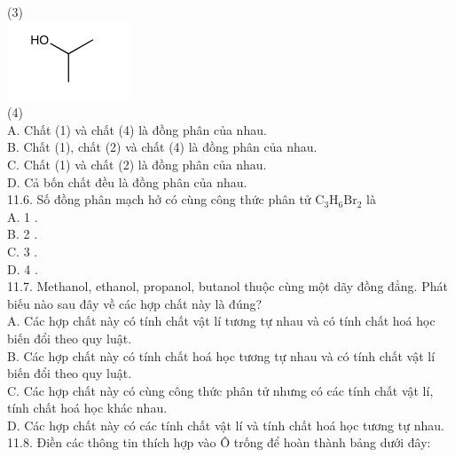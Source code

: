 \documentclass[10pt]{article}
\begin{document}
(3)\\
\includegraphics{smile-27287e9c228b535dfc34387348ef0576563872c2}\\
(4)\\
A. Chất (1) và chất (4) là đồng phân của nhau.\\
B. Chất (1), chất (2) và chất (4) là đồng phân của nhau.\\
C. Chất (1) và chất (2) là đồng phân của nhau.\\
D. Cả bốn chất đều là đồng phân của nhau.\\
11.6. Số đồng phân mạch hở có cùng công thức phân tử $\mathrm{C}_{3} \mathrm{H}_{6} \mathrm{Br}_{2}$ là\\
A. 1 .\\
B. 2 .\\
C. 3 .\\
D. 4 .\\
11.7. Methanol, ethanol, propanol, butanol thuộc cùng một dãy đồng đẳng. Phát biếu nào sau đây về các hợp chất này là đúng?\\
A. Các hợp chất này có tính chất vật lí tương tự nhau và có tính chất hoá học biến đổi theo quy luật.\\
B. Các hợp chất này có tính chất hoá học tương tự nhau và có tính chất vật lí biến đổi theo quy luật.\\
C. Các hợp chất này có cùng công thức phân tử nhưng có các tính chất vật lí, tính chất hoá học khác nhau.\\
D. Các hợp chất này có các tính chất vật lí và tính chất hoá học tương tự nhau.\\
11.8. Điền các thông tin thích hợp vào Ô trống để hoàn thành bảng dưới đây:
\end{document}
